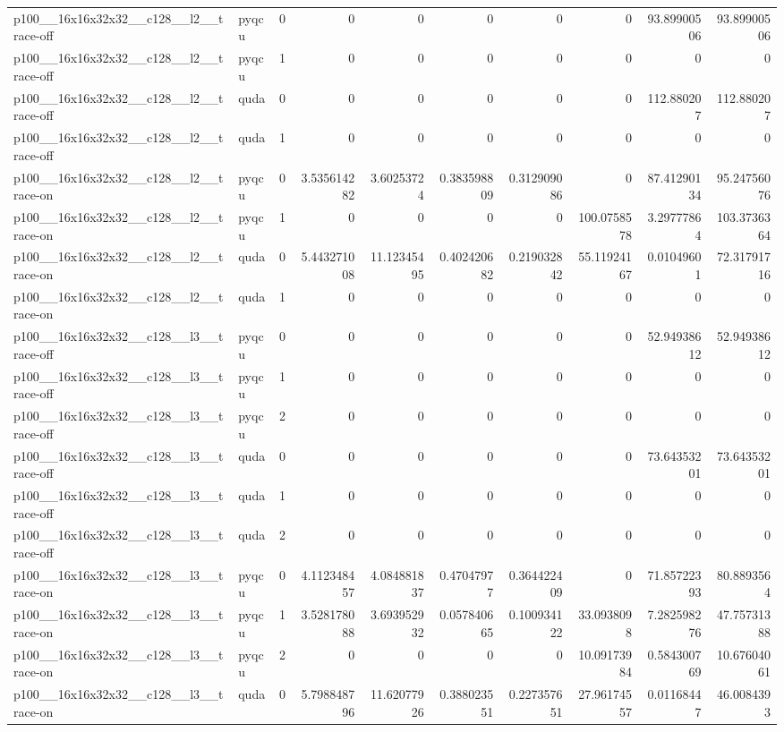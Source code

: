 \begin{table}[htbp]
\begin{tabular}{@{}llrrrrrrrr@{}}
p100\_\_16x16x32x32\_\_c128\_\_l2\_\_trace-off & pyqcu & 0 & 0 & 0 & 0 & 0 & 0 & 93.89900506 & 93.89900506 \\
p100\_\_16x16x32x32\_\_c128\_\_l2\_\_trace-off & pyqcu & 1 & 0 & 0 & 0 & 0 & 0 & 0 & 0 \\
p100\_\_16x16x32x32\_\_c128\_\_l2\_\_trace-off & quda & 0 & 0 & 0 & 0 & 0 & 0 & 112.880207 & 112.880207 \\
p100\_\_16x16x32x32\_\_c128\_\_l2\_\_trace-off & quda & 1 & 0 & 0 & 0 & 0 & 0 & 0 & 0 \\
p100\_\_16x16x32x32\_\_c128\_\_l2\_\_trace-on & pyqcu & 0 & 3.535614282 & 3.60253724 & 0.383598809 & 0.312909086 & 0 & 87.41290134 & 95.24756076 \\
p100\_\_16x16x32x32\_\_c128\_\_l2\_\_trace-on & pyqcu & 1 & 0 & 0 & 0 & 0 & 100.0758578 & 3.29777864 & 103.3736364 \\
p100\_\_16x16x32x32\_\_c128\_\_l2\_\_trace-on & quda & 0 & 5.443271008 & 11.12345495 & 0.402420682 & 0.219032842 & 55.11924167 & 0.01049601 & 72.31791716 \\
p100\_\_16x16x32x32\_\_c128\_\_l2\_\_trace-on & quda & 1 & 0 & 0 & 0 & 0 & 0 & 0 & 0 \\
p100\_\_16x16x32x32\_\_c128\_\_l3\_\_trace-off & pyqcu & 0 & 0 & 0 & 0 & 0 & 0 & 52.94938612 & 52.94938612 \\
p100\_\_16x16x32x32\_\_c128\_\_l3\_\_trace-off & pyqcu & 1 & 0 & 0 & 0 & 0 & 0 & 0 & 0 \\
p100\_\_16x16x32x32\_\_c128\_\_l3\_\_trace-off & pyqcu & 2 & 0 & 0 & 0 & 0 & 0 & 0 & 0 \\
p100\_\_16x16x32x32\_\_c128\_\_l3\_\_trace-off & quda & 0 & 0 & 0 & 0 & 0 & 0 & 73.64353201 & 73.64353201 \\
p100\_\_16x16x32x32\_\_c128\_\_l3\_\_trace-off & quda & 1 & 0 & 0 & 0 & 0 & 0 & 0 & 0 \\
p100\_\_16x16x32x32\_\_c128\_\_l3\_\_trace-off & quda & 2 & 0 & 0 & 0 & 0 & 0 & 0 & 0 \\
p100\_\_16x16x32x32\_\_c128\_\_l3\_\_trace-on & pyqcu & 0 & 4.112348457 & 4.084881837 & 0.47047977 & 0.364422409 & 0 & 71.85722393 & 80.8893564 \\
p100\_\_16x16x32x32\_\_c128\_\_l3\_\_trace-on & pyqcu & 1 & 3.528178088 & 3.693952932 & 0.057840665 & 0.100934122 & 33.0938098 & 7.282598276 & 47.75731388 \\
p100\_\_16x16x32x32\_\_c128\_\_l3\_\_trace-on & pyqcu & 2 & 0 & 0 & 0 & 0 & 10.09173984 & 0.584300769 & 10.67604061 \\
p100\_\_16x16x32x32\_\_c128\_\_l3\_\_trace-on & quda & 0 & 5.798848796 & 11.62077926 & 0.388023551 & 0.227357651 & 27.96174557 & 0.01168447 & 46.0084393 \\

\end{tabular}
\end{table}
